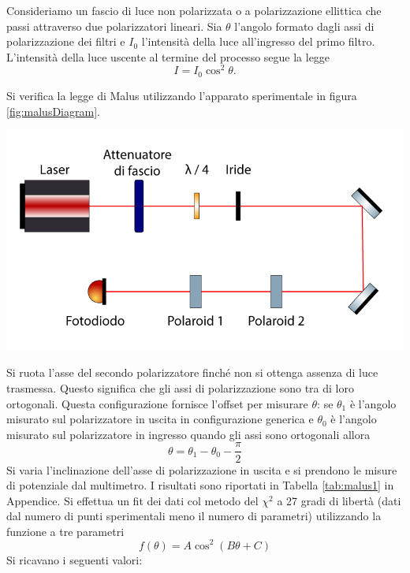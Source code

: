 \documentclass[10pt,oneside,a4paper]{article}
\newenvironment{Figure}
  {\par\medskip\noindent\minipage{\linewidth}}
  {\endminipage\par\medskip}
\begin{document}
\begin{multicols}{2}
Consideriamo un fascio di luce non polarizzata o a polarizzazione ellittica che passi attraverso due polarizzatori lineari. Sia $\theta$ l'angolo formato dagli assi di polarizzazione dei filtri e $I_0$ l'intensità della luce all'ingresso del primo filtro. L'intensità della luce uscente al termine del processo segue la legge
\begin{equation}\label{eq:Malus1}
  I = I_0\cos^2\theta.
\end{equation}

Si verifica la legge di Malus utilizzando l'apparato sperimentale in figura \ref{fig:malusDiagram}. 
\begin{Figure}
	\begin{center}
	\includegraphics[width=\linewidth]{malus1Diagram.png}
	\label{fig:malusDiagram}
	\end{center}
\end{Figure}
Si ruota l'asse del secondo polarizzatore finché non si ottenga assenza di luce trasmessa. Questo significa che gli assi di polarizzazione sono tra di loro ortogonali. Questa configurazione fornisce l'offset per misurare $\theta$: se $\theta_1$ è l'angolo misurato sul polarizzatore in uscita in configurazione generica e $\theta_0$ è l'angolo misurato sul polarizzatore in ingresso quando gli assi sono ortogonali allora
\[
\theta = \theta_1 - \theta_0 - \frac{\pi}{2}
\]
Si varia l'inclinazione dell'asse di polarizzazione in uscita e si prendono le misure di potenziale dal multimetro. I risultati sono riportati in Tabella \ref{tab:malus1} in Appendice. Si effettua un fit dei dati col metodo del $\chi^2$ a 27 gradi di libertà (dati dal numero di punti sperimentali meno il numero di parametri) utilizzando la funzione a tre parametri
\[
f(\theta) = A\cos^2(B\theta + C)
\]
Si ricavano i seguenti valori:

\end{multicols}
\end{document}
